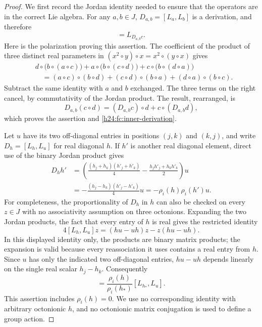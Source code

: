 \begin{proof}
We first record the Jordan identity needed to ensure that the operators
are in the correct Lie algebra. For any $a,b\in J$,
$D_{a,b}=[L_a,L_b]$ is a derivation, and therefore
\begin{equation}
 [D_{a,b},L_c]=L_{D_{a,b}c}.
 \label{h24:fc:inner-derivation}
\end{equation}
Here is the polarization proving this assertion. The coefficient of the
product of three distinct real parameters in
$(x^2\circ y)\circ x=x^2\circ(y\circ x)$ gives
\[
 \begin{split}
 &d\circ\bigl(b\circ(a\circ c)\bigr)
 +a\circ\bigl(b\circ(c\circ d)\bigr)
 +c\circ\bigl(b\circ(d\circ a)\bigr)\\
 &\hspace{1em}=(a\circ c)\circ(b\circ d)
 +(c\circ d)\circ(b\circ a)
 +(d\circ a)\circ(b\circ c).
 \end{split}
\]
Subtract the same identity with $a$ and $b$ exchanged. The three
terms on the right cancel, by commutativity of the Jordan product.
The result, rearranged, is
\[
 D_{a,b}(c\circ d)=(D_{a,b}c)\circ d+c\circ(D_{a,b}d),
\]
which proves the assertion and \eqref{h24:fc:inner-derivation}.

Let $u$ have its two off-diagonal entries in positions $(j,k)$ and
$(k,j)$, and write $D_h=[L_h,L_u]$ for real diagonal $h$.
If $h'$ is another real diagonal element, direct use of the binary
Jordan product gives
\begin{equation}
 \begin{split}
 D_hh'
 &=\left(\frac{(h_j+h_k)(h'_j+h'_k)}4
                 -\frac{h_jh'_j+h_kh'_k}2\right)u\\
 &=-\frac{(h_j-h_k)(h'_j-h'_k)}4u
  =-\rho_i(h)\rho_i(h')u.
 \end{split}
 \label{h24:fc:diagonal-calculation}
\end{equation}
For completeness, the proportionality of $D_h$ in $h$ can also be
checked on every $z\in J$ with no associativity assumption on three
octonions. Expanding the two Jordan products, the fact that every
entry of $h$ is real gives the restricted identity
\[
 4[L_h,L_u]z=(hu-uh)z-z(hu-uh).
\]
In this displayed identity only, the products are binary matrix
products; the expansion is valid because every reassociation it uses
contains a real entry from $h$. Since $u$ has only the indicated two
off-diagonal entries, $hu-uh$ depends linearly on the single real
scalar $h_j-h_k$. Consequently
\begin{equation}
 [L_h,L_u]=\frac{\rho_i(h)}{\rho_i(h_*)}[L_{h_*},L_u].
 \label{h24:fc:proportionality}
\end{equation}
This assertion includes $\rho_i(h)=0$. We use no corresponding
identity with arbitrary octonionic $h$, and no octonionic matrix
conjugation is used to define a group action.


\end{proof}
